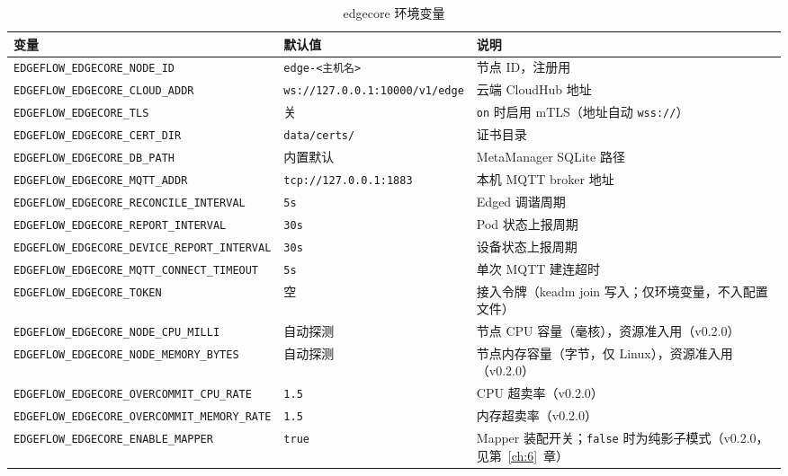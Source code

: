 \begin{table}[htbp]
\centering
\caption{edgecore 环境变量}
\label{tab:5-env}
\begin{tabularx}{\textwidth}{>{\raggedright\arraybackslash}p{4.5cm} >{\raggedright\arraybackslash}p{2.8cm} X}
\toprule
\textbf{变量} & \textbf{默认值} & \textbf{说明} \\
\midrule
\texttt{EDGEFLOW\_EDGECORE\_NODE\_ID} & \texttt{edge-\allowbreak<主机名>} & 节点 ID，注册用 \\
\texttt{EDGEFLOW\_EDGECORE\_CLOUD\_ADDR} & \texttt{ws://127.0.0.1:10000/v1/edge} & 云端 CloudHub 地址 \\
\texttt{EDGEFLOW\_EDGECORE\_TLS} & 关 & \texttt{on} 时启用 mTLS（地址自动 \texttt{wss://}） \\
\texttt{EDGEFLOW\_EDGECORE\_CERT\_DIR} & \texttt{data/certs/} & 证书目录 \\
\texttt{EDGEFLOW\_EDGECORE\_DB\_PATH} & 内置默认 & MetaManager SQLite 路径 \\
\texttt{EDGEFLOW\_EDGECORE\_MQTT\_ADDR} & \texttt{tcp://127.0.0.1:1883} & 本机 MQTT broker 地址 \\
\texttt{EDGEFLOW\_EDGECORE\_RECONCILE\_INTERVAL} & \texttt{5s} & Edged 调谐周期 \\
\texttt{EDGEFLOW\_EDGECORE\_REPORT\_INTERVAL} & \texttt{30s} & Pod 状态上报周期 \\
\texttt{EDGEFLOW\_EDGECORE\_DEVICE\_REPORT\_INTERVAL} & \texttt{30s} & 设备状态上报周期 \\
\texttt{EDGEFLOW\_EDGECORE\_MQTT\_CONNECT\_TIMEOUT} & \texttt{5s} & 单次 MQTT 建连超时 \\
\texttt{EDGEFLOW\_EDGECORE\_TOKEN} & 空 & 接入令牌（keadm join 写入；仅环境变量，不入配置文件） \\
\texttt{EDGEFLOW\_EDGECORE\_NODE\_CPU\_MILLI} & 自动探测 & 节点 CPU 容量（毫核），资源准入用（v0.2.0） \\
\texttt{EDGEFLOW\_EDGECORE\_NODE\_MEMORY\_BYTES} & 自动探测 & 节点内存容量（字节，仅 Linux），资源准入用（v0.2.0） \\
\texttt{EDGEFLOW\_EDGECORE\_OVERCOMMIT\_CPU\_RATE} & \texttt{1.5} & CPU 超卖率（v0.2.0） \\
\texttt{EDGEFLOW\_EDGECORE\_OVERCOMMIT\_MEMORY\_RATE} & \texttt{1.5} & 内存超卖率（v0.2.0） \\
\texttt{EDGEFLOW\_EDGECORE\_ENABLE\_MAPPER} & \texttt{true} & Mapper 装配开关；\texttt{false} 时为纯影子模式（v0.2.0，见第~\ref{ch:6}~章） \\
\bottomrule
\end{tabularx}
\end{table}

